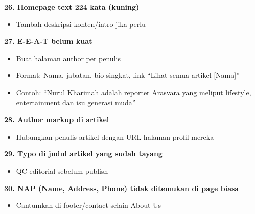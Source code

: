 \documentclass[12pt,a4paper]{article}
\begin{document}
\textbf{26. Homepage text 224 kata (kuning)}
\begin{itemize}[topsep=0pt, partopsep=0pt, itemsep=2pt]
    \item Tambah deskripsi konten/intro jika perlu
\end{itemize}

\textbf{27. E-E-A-T belum kuat}
\begin{itemize}[topsep=0pt, partopsep=0pt, itemsep=2pt]
    \item Buat halaman author per penulis
    \item Format: Nama, jabatan, bio singkat, link ``Lihat semua artikel [Nama]''
    \item Contoh: ``Nurul Kharimah adalah reporter Arasvara yang meliput lifestyle, entertainment dan isu generasi muda''
\end{itemize}

\textbf{28. Author markup di artikel}
\begin{itemize}[topsep=0pt, partopsep=0pt, itemsep=2pt]
    \item Hubungkan penulis artikel dengan URL halaman profil mereka
\end{itemize}

\textbf{29. Typo di judul artikel yang sudah tayang}
\begin{itemize}[topsep=0pt, partopsep=0pt, itemsep=2pt]
    \item QC editorial sebelum publish
\end{itemize}

\textbf{30. NAP (Name, Address, Phone) tidak ditemukan di page biasa}
\begin{itemize}[topsep=0pt, partopsep=0pt, itemsep=2pt]
    \item Cantumkan di footer/contact selain About Us
\end{itemize}
\end{document}
